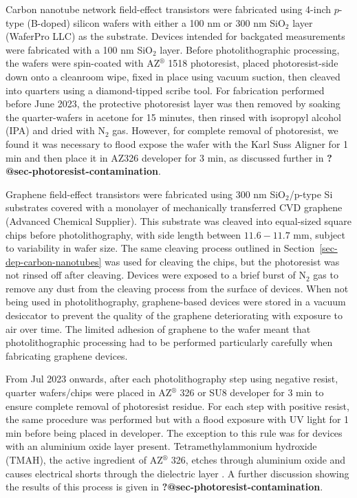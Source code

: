 \documentclass[
  a4paper,
]{scrbook}
\begin{document}
Carbon nanotube network field-effect transistors were fabricated using
4-inch \(p\)-type (B-doped) silicon wafers with either a 100 nm or 300
nm SiO\(_2\) layer (WaferPro LLC) as the substrate. Devices intended for
backgated measurements were fabricated with a 100 nm SiO\(_2\) layer.
Before photolithographic processing, the wafers were spin-coated with
AZ\(^\circledR\) 1518 photoresist, placed photoresist-side down onto a
cleanroom wipe, fixed in place using vacuum suction, then cleaved into
quarters using a diamond-tipped scribe tool. For fabrication performed
before June 2023, the protective photoresist layer was then removed by
soaking the quarter-wafers in acetone for 15 minutes, then rinsed with
isopropyl alcohol (IPA) and dried with N\(_2\) gas. However, for
complete removal of photoresist, we found it was necessary to flood
expose the wafer with the Karl Suss Aligner for 1 min and then place it
in AZ326 developer for 3 min, as discussed further in
\textbf{?@sec-photoresist-contamination}.

Graphene field-effect transistors were fabricated using 300 nm
SiO\(_2\)/p-type Si substrates covered with a monolayer of mechanically
transferred CVD graphene (Advanced Chemical Supplier). This substrate
was cleaved into equal-sized square chips before photolithography, with
side length between \(11.6-11.7\) mm, subject to variability in wafer
size. The same cleaving process outlined in
Section~\ref{sec-dep-carbon-nanotubes} was used for cleaving the chips,
but the photoresist was not rinsed off after cleaving. Devices were
exposed to a brief burst of N\(_2\) gas to remove any dust from the
cleaving process from the surface of devices. When not being used in
photolithography, graphene-based devices were stored in a vacuum
desiccator to prevent the quality of the graphene deteriorating with
exposure to air over time. The limited adhesion of graphene to the wafer
meant that photolithographic processing had to be performed particularly
carefully when fabricating graphene devices.

From Jul 2023 onwards, after each photolithography step using negative
resist, quarter wafers/chips were placed in AZ\(^\circledR\) 326 or SU8
developer for 3 min to ensure complete removal of photoresist residue.
For each step with positive resist, the same procedure was performed but
with a flood exposure with UV light for 1 min before being placed in
developer. The exception to this rule was for devices with an aluminium
oxide layer present. Tetramethylammonium hydroxide (TMAH), the active
ingredient of AZ\(^\circledR\) 326, etches through aluminium oxide and
causes electrical shorts through the dielectric layer
\autocite{Oh2011,Ali2021}. A further discussion showing the results of
this process is given in \textbf{?@sec-photoresist-contamination}.
\end{document}
